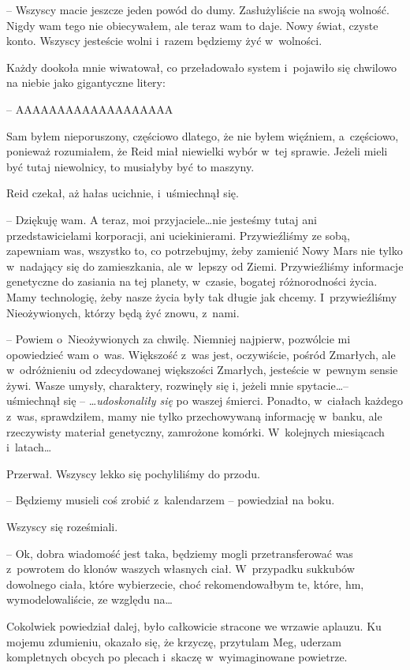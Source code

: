 \documentclass[oneside,polish,11pt,sfheadings]{mwbk}
\begin{document}
-- Wszyscy macie jeszcze jeden powód do dumy. Zasłużyliście na swoją
wolność. Nigdy wam tego nie obiecywałem, ale teraz wam to daje. Nowy
świat, czyste konto. Wszyscy jesteście wolni i~razem będziemy żyć w~wolności.

Każdy dookoła mnie wiwatował, co przeładowało system i~pojawiło się
chwilowo na niebie jako gigantyczne litery: 

-- AAAAAAAAAAAAAAAAAAA 

Sam byłem nieporuszony, częściowo dlatego, że nie byłem więźniem, a~częściowo, ponieważ rozumiałem, że Reid miał niewielki wybór w~tej
sprawie. Jeżeli mieli być tutaj niewolnicy, to musiałyby być to maszyny.

Reid czekał, aż hałas ucichnie, i~uśmiechnął się.

-- Dziękuję wam. A teraz, moi przyjaciele\ldots nie jesteśmy tutaj ani
przedstawicielami korporacji, ani uciekinierami. Przywieźliśmy ze sobą,
zapewniam was, wszystko to, co potrzebujmy, żeby zamienić Nowy Mars nie
tylko w~nadający się do zamieszkania, ale w~lepszy od Ziemi.
Przywieźliśmy informacje genetyczne do zasiania na tej planety, w~czasie, bogatej różnorodności życia. Mamy technologię, żeby nasze życia
były tak długie jak chcemy. I~przywieźliśmy Nieożywionych, którzy będą
żyć znowu, z~nami.

-- Powiem o~Nieożywionych za chwilę. Niemniej najpierw, pozwólcie mi
opowiedzieć wam o~was. Większość z~was jest, oczywiście, pośród
Zmarłych, ale w~odróżnieniu od zdecydowanej większości Zmarłych,
jesteście w~pewnym sensie żywi. Wasze umysły, charaktery, rozwinęły się
i, jeżeli mnie spytacie\ldots -- uśmiechnął się -- \ldots\emph{udoskonaliły się}
po waszej śmierci. Ponadto, w~ciałach każdego z~was, sprawdziłem, mamy
nie tylko przechowywaną informację w~banku, ale rzeczywisty materiał
genetyczny, zamrożone komórki. W~kolejnych miesiącach i~latach\ldots

Przerwał. Wszyscy lekko się pochyliliśmy do przodu.

-- Będziemy musieli coś zrobić z~kalendarzem -- powiedział na boku.

Wszyscy się roześmiali.

-- Ok, dobra wiadomość jest taka, będziemy mogli przetransferować was z~powrotem do klonów waszych własnych ciał. W~przypadku sukkubów dowolnego
ciała, które wybierzecie, choć rekomendowałbym te, które, hm,
wymodelowaliście, ze względu na\ldots

Cokolwiek powiedział dalej, było całkowicie stracone we wrzawie aplauzu.
Ku mojemu zdumieniu, okazało się, że krzyczę, przytulam Meg, uderzam
kompletnych obcych po plecach i~skaczę w~wyimaginowane powietrze.
\end{document}
